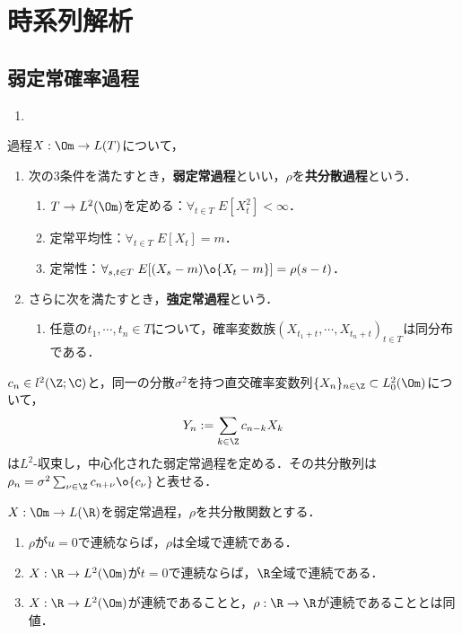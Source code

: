 \documentclass[uplatex,dvipdfmx]{jsreport}
\begin{document}
\chapter{時系列解析}

\section{弱定常確率過程}

\begin{enumerate}[({A}1)]
    \item 
\end{enumerate}

\begin{definition}
    過程$X:\Om\to L(T)$について，
    \begin{enumerate}
        \item 次の3条件を満たすとき，\textbf{弱定常過程}といい，$\rho$を\textbf{共分散過程}という．
        \begin{enumerate}[({W}1)]
            \item $T\to L^2(\Om)$を定める：$\forall_{t\in T}\;E[X^2_t]<\infty$．
            \item 定常平均性：$\forall_{t\in T}\;E[X_t]=m$．
            \item 定常性：$\forall_{s,t\in T}\;E[(X_s-m)\o{X_t-m}]=\rho(s-t)$．
        \end{enumerate}
        \item さらに次を満たすとき，\textbf{強定常過程}という．
        \begin{enumerate}[({S}1)]
            \item 任意の$t_1,\cdots,t_n\in T$について，確率変数族$(X_{t_1+t},\cdots,X_{t_n+t})_{t\in T}$は同分布である．
        \end{enumerate}
    \end{enumerate}
\end{definition}

\begin{theorem}[弱定常過程の構成]
    $c_n\in l^2(\Z;\C)$と，同一の分散$\sigma^2$を持つ直交確率変数列$\{X_n\}_{n\in\Z}\subset L_0^2(\Om)$について，
    \[Y_n:=\sum_{k\in\Z}c_{n-k}X_k\]
    は$L^2$-収束し，中心化された弱定常過程を定める．その共分散列は$\rho_n=\sigma^2\sum_{\nu\in\Z}c_{n+\nu}\o{c_\nu}$と表せる．
\end{theorem}

\begin{theorem}
    $X:\Om\to L(\R)$を弱定常過程，$\rho$を共分散関数とする．
    \begin{enumerate}
        \item $\rho$が$u=0$で連続ならば，$\rho$は全域で連続である．
        \item $X:\R\to L^2(\Om)$が$t=0$で連続ならば，$\R$全域で連続である．
        \item $X:\R\to L^2(\Om)$が連続であることと，$\rho:\R\to\R$が連続であることとは同値．
    \end{enumerate}
\end{theorem}
\end{document}
